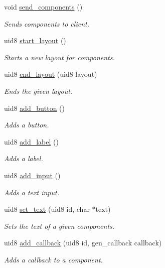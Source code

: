 \begin{DoxyCompactItemize}
void \hyperlink{class_app_builder_a565d521564d9e8adde4f9b25cba906a7}{send\+\_\+components} ()
\begin{DoxyCompactList}\small\item\em Sends components to client. \end{DoxyCompactList}\item 
uid8 \hyperlink{class_app_builder_adc5670db6d3c4cbe0d4b3ceb00681924}{start\+\_\+layout} ()
\begin{DoxyCompactList}\small\item\em Starts a new layout for components. \end{DoxyCompactList}\item 
uid8 \hyperlink{class_app_builder_a1dcca0da629856a7e4567a7633d87b3b}{end\+\_\+layout} (uid8 layout)
\begin{DoxyCompactList}\small\item\em Ends the given layout. \end{DoxyCompactList}\item 
uid8 \hyperlink{class_app_builder_a91695584a8d0f6da6df357d11f5b443e}{add\+\_\+button} ()
\begin{DoxyCompactList}\small\item\em Adds a button. \end{DoxyCompactList}\item 
uid8 \hyperlink{class_app_builder_ac4cbded7a415dd3fbd78e78114143132}{add\+\_\+label} ()
\begin{DoxyCompactList}\small\item\em Adds a label. \end{DoxyCompactList}\item 
uid8 \hyperlink{class_app_builder_a48caec6424a2425dc91f3537bc2d1fac}{add\+\_\+input} ()
\begin{DoxyCompactList}\small\item\em Adds a text input. \end{DoxyCompactList}\item 
uid8 \hyperlink{class_app_builder_a1d8ef2e415b7dc7f97d99fa005e028ba}{set\+\_\+text} (uid8 id, char $\ast$text)
\begin{DoxyCompactList}\small\item\em Sets the text of a given components. \end{DoxyCompactList}\item 
uid8 \hyperlink{class_app_builder_a20381756dd3a8933c25952ff5a276e2d}{add\+\_\+callback} (uid8 id, gen\+\_\+callback callback)
\begin{DoxyCompactList}\small\item\em Adds a callback to a component. \end{DoxyCompactList}\end{DoxyCompactItemize}


